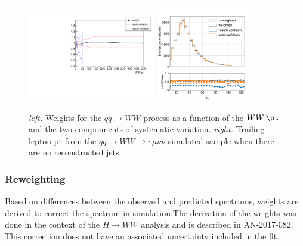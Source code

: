 \begin{figure}[ht]
    \centering
    \includegraphics[width=0.5\textwidth]{chapters/Analysis/sectionDataset/figures/ww_pt_weight_variations}
    \includegraphics[width=0.38\textwidth]{chapters/Analysis/sectionDataset/figures/ww_pt_lepton_pt}
    \caption{\emph{left.} Weights for the $qq\rightarrow WW$ process as a function of the $WW\,\pt$ and the two componnents of systematic variation.  \emph{right.} Trailing lepton pt from the $qq\rightarrow WW\rightarrow e\mu\nu\nu$ simulated sample when there are no reconstructed jets.} 
    \label{fig:analysis:dataset:ww_weight}
\end{figure}



\subsubsection{\cPZ \pt Reweighting}
Based on differences between the observed and predicted \PZ \pt spectrums, weights are derived to correct the \pt spectrum in simulation.The derivation of the weights was done in the context of the $H\rightarrow WW$ analysis and is described in AN-2017-082. This correction does not have an associated uncertainty included in the fit.

